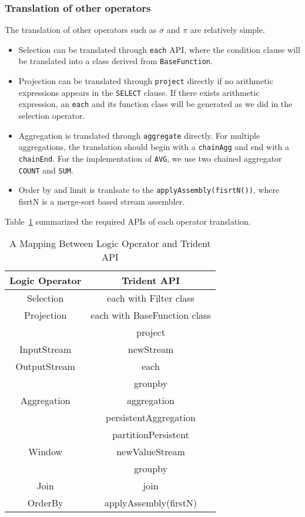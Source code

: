 \documentclass[conference, twocolumn, 11pt]{IEEEtran}
\theoremstyle{definition}
\begin{document}
\subsubsection{Translation of other operators}
The translation of other operators such as $\sigma$ and $\pi$ are relatively simple.
\begin{itemize}
\item Selection can be translated through \texttt{each} API, where the condition clause will be translated into a class derived from \texttt{BaseFunction}.
\item Projection can be translated through \texttt{project} directly if no arithmetic expressions appears in the \texttt{SELECT} clause. If there exists arithmetic expression, an \texttt{each} and its function class will be generated as we did in the selection operator.
\item Aggregation is translated through \texttt{aggregate} directly. For multiple aggregations, the translation should begin with a \texttt{chainAgg} and end with a \texttt{chainEnd}. For the implementation of \texttt{AVG}, we use two chained aggregator \texttt{COUNT} and \texttt{SUM}.
\item Order by and limit is tranlsate to the \texttt{applyAssembly(fisrtN())}, where fisrtN is a merge-sort based stream assembler.
\end{itemize}
Table~\ref{api-mapping} summarized the required APIs of each operator translation.
\begin{table}[hbt]
\caption{A Mapping Between Logic Operator and Trident API}
\label{api-mapping}
\centering
\begin{tabular}{|c|c|}
\hline
Logic Operator & Trident API \\
\hline
Selection      & each with Filter class \\
\hline
Projection     & each with BaseFunction class \\
               & project \\
\hline
InputStream    & newStream \\
\hline
OutputStream   & each \\
\hline
               & groupby       \\
Aggregation    & aggregation \\
               & persistentAggregation \\
\hline
               & partitionPersistent \\ 
Window         & newValueStream      \\ 
               & groupby             \\
\hline
Join           & join                 \\
\hline
OrderBy        & applyAssembly(firstN) \\
\hline
\end{tabular}
\end{table}
\end{document}

